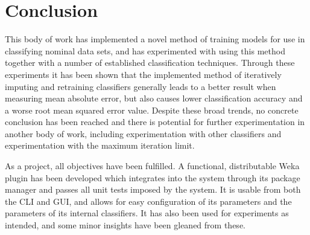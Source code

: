 \newpage
\chapter{Conclusion}\label{conclusion}
This body of work has implemented a novel method of training models for use in classifying nominal data sets, and has experimented with using this method together with a number of established classification techniques. Through these experiments it has been shown that the implemented method of iteratively imputing and retraining classifiers generally leads to a better result when measuring mean absolute error, but also causes lower classification accuracy and a worse root mean squared error value. Despite these broad trends, no concrete conclusion has been reached and there is potential for further experimentation in another body of work, including experimentation with other classifiers and experimentation with the maximum iteration limit.

As a project, all objectives have been fulfilled. A functional, distributable Weka plugin has been developed which integrates into the system through its package manager and passes all unit tests imposed by the system. It is usable from both the CLI and GUI, and allows for easy configuration of its parameters and the parameters of its internal classifiers. It has also been used for experiments as intended, and some minor insights have been gleaned from these.